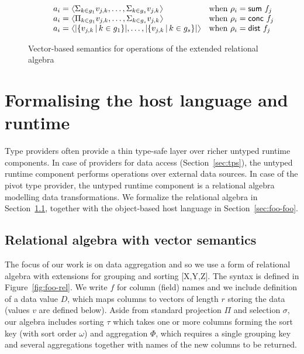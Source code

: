 \documentclass[a4paper,UKenglish]{lipics-v2016}
\theoremstyle{plain}
\theoremstyle{definition}
\newcommand{\vect}[1]{\langl #1 \rangl}
\newcommand{\langl}{\begin{picture}(4.5,7)
\put(1.1,2.5){\rotatebox{60}{\line(1,0){5.5}}}
\put(1.1,2.5){\rotatebox{300}{\line(1,0){5.5}}}
\end{picture}}
\newcommand{\rangl}{\begin{picture}(4.5,7)
\put(.9,2.5){\rotatebox{120}{\line(1,0){5.5}}}
\put(.9,2.5){\rotatebox{240}{\line(1,0){5.5}}}
\end{picture}}
\newcommand{\ident}[1]{\textnormal{\sffamily #1}}
\begin{document}
\begin{figure}
\begin{equation*}
\begin{array}{l}
\begin{array}{ll}
    \qquad a_i = \vect{\Sigma_{k\in g_1}v_{j,k}, \ldots, \Sigma_{k\in g_s}v_{j,k}} & \textnormal{when}~\rho_i = \ident{sum}~f_j \\
    \qquad a_i = \vect{\Pi_{k\in g_1}v_{j,k}, \ldots, \Sigma_{k\in g_s}v_{j,k}}   & \textnormal{when}~\rho_i = \ident{conc}~f_j \\
    \qquad a_i = \vect{|\{v_{j,k}\,|\, k\in g_1\}|, \ldots, |\{v_{j,k}\,|\, k\in g_s\}|}  & \textnormal{when}~\rho_i = \ident{dist}~f_j \\
  \end{array}\\
\end{array}
\end{equation*}

\caption{Vector-based semantics for operations of the extended relational algebra}
\label{fig:foo-relsem}
\end{figure}


\section{Formalising the host language and runtime}
\label{sec:foo}

Type providers often provide a thin type-safe layer over richer untyped runtime components. In case 
of providers for data access (Section~\ref{sec:tps}), the untyped runtime component performs operations
over external data sources. In case of the pivot type provider, the untyped runtime component 
is a relational algebra modelling data transformations. We formalize the relational algebra in 
Section~\ref{sec:foo-rel}, together with the object-based host language in Section~\ref{sec:foo-foo}.

\subsection{Relational algebra with vector semantics}
\label{sec:foo-rel}

The focus of our work is on data aggregation and so we use a form of relational algebra with 
extensions for grouping and sorting [X,Y,Z]. The syntax is defined in Figure~\ref{fig:foo-rel}.
We write $f$ for column (field) names and we include definition of a data value $D$, which maps
columns to vectors of length $r$ storing the data (values $v$ are defined below).
Aside from standard projection $\Pi$ and selection $\sigma$, our algebra includes sorting 
$\tau$ which takes one or more columns forming the sort key (with sort order $\omega$)
and aggregation $\Phi$, which requires a single grouping key and several aggregations together with 
names of the new columns to be returned.
\end{document}
